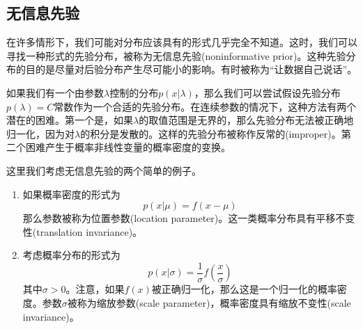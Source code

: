 \subsection*{无信息先验}
在许多情形下，我们可能对分布应该具有的形式几乎完全不知道。这时，我们可以寻找一种形式的先验分布，被称为无信息先验(noninformative prior)。这种先验分布的目的是尽量对后验分布产生尽可能小的影响。有时被称为“让数据自己说话”。

如果我们有一个由参数$\lambda$控制的分布$p(x|\lambda)$，那么我们可以尝试假设先验分布$p(\lambda)=C$常数作为一个合适的先验分布。在连续参数的情况下，这种方法有两个潜在的困难。第一个是，如果$\lambda$的取值范围是无界的，那么先验分布无法被正确地归一化，因为对$\lambda$的积分是发散的。这样的先验分布被称作反常的(improper)。第二个困难产生于概率非线性变量的概率密度的变换。

这里我们考虑无信息先验的两个简单的例子。
\begin{enumerate}
	\item 如果概率密度的形式为
	\begin{equation}
		p(x|\mu)=f(x-\mu)
	\end{equation} 
	那么参数被称为位置参数(location parameter)。这一类概率分布具有平移不变性(translation invariance)。
	\item 考虑概率分布的形式为
	\begin{equation}
		p(x|\sigma)=\frac{1}{\sigma}f\left(\frac{x}{\sigma} \right)
	\end{equation}
	其中$\sigma>0$。注意，如果$f(x)$被正确归一化，那么这是一个归一化的概率密度。参数$\sigma$被称为缩放参数(scale parameter)，概率密度具有缩放不变性(scale invariance)。
\end{enumerate}